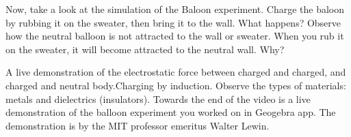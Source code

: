 \documentclass{ximera}
\begin{document}
Now, take a look at the simulation of the Baloon experiment. Charge the baloon by rubbing it on the sweater, then bring it to the wall. What happens? Observe how the neutral balloon is not attracted to the wall or sweater. When you rub it on the sweater, it will become attracted to the neutral wall. Why?

\begin{center}  
\end{center} 

 A live demonstration of the electrostatic force between charged and charged, and charged and neutral body.Charging by induction.  Observe the types of materials: metals and dielectrics (insulators). Towards the end of the video is a live demonstration of the balloon experiment you worked on in Geogebra app. The demonstration is by 
 the MIT professor emeritus Walter Lewin.

 \begin{center}
 \end{center}
\end{document}
